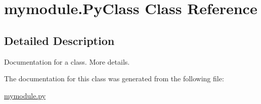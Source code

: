 \hypertarget{classmymodule_1_1_py_class}{}\section{mymodule.\+Py\+Class Class Reference}
\label{classmymodule_1_1_py_class}


\subsection{Detailed Description}
\begin{DoxyVerb}Documentation for a class.
More details.
\end{DoxyVerb}
 

The documentation for this class was generated from the following file\+:\begin{DoxyCompactItemize}
\item 
\hyperlink{mymodule_8py}{mymodule.\+py}\end{DoxyCompactItemize}
